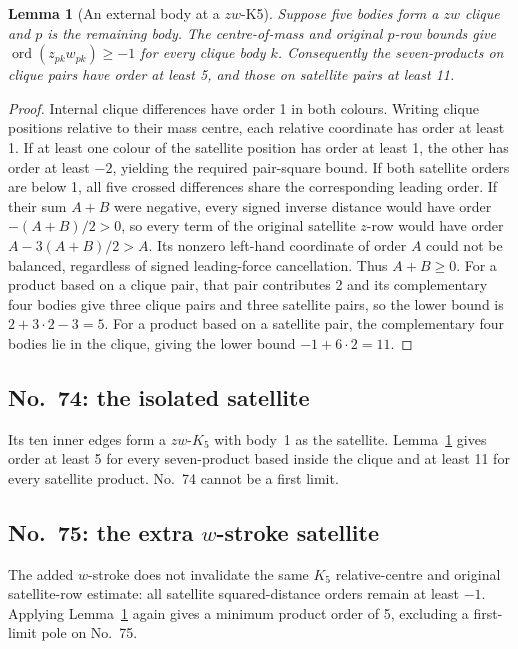 \documentclass[11pt]{amsart}
\newtheorem{lemma}[theorem]{Lemma}
\theoremstyle{remark}
\newcommand{\ord}{\operatorname{ord}}
\newcommand{\Needspace}[1]{\par\ifdim\dimexpr\pagegoal-\pagetotal\relax<#1\newpage\fi}
\begin{document}
\begin{lemma}[An external body at a $zw$-K5]\label{lem:excluded-satellite}
Suppose five bodies form a $zw$ clique and $p$ is the remaining body. The centre-of-mass and original $p$-row bounds give $\ord(z_{pk}w_{pk})\ge-1$ for every clique body $k$. Consequently the seven-products on clique pairs have order at least 5, and those on satellite pairs at least 11.
\end{lemma}
\begin{proof}
Internal clique differences have order 1 in both colours. Writing clique positions relative to their mass centre, each relative coordinate has order at least 1. If at least one colour of the satellite position has order at least 1, the other has order at least $-2$, yielding the required pair-square bound. If both satellite orders are below 1, all five crossed differences share the corresponding leading order. If their sum $A+B$ were negative, every signed inverse distance would have order $-(A+B)/2>0$, so every term of the original satellite $z$-row would have order $A-3(A+B)/2>A$. Its nonzero left-hand coordinate of order $A$ could not be balanced, regardless of signed leading-force cancellation. Thus $A+B\ge0$. For a product based on a clique pair, that pair contributes 2 and its complementary four bodies give three clique pairs and three satellite pairs, so the lower bound is $2+3\cdot2-3=5$. For a product based on a satellite pair, the complementary four bodies lie in the clique, giving the lower bound $-1+6\cdot2=11$.
\end{proof}
\Needspace{8\baselineskip}
\subsection{No.~74: the isolated satellite}
Its ten inner edges form a $zw$-$K_5$ with body~1 as the
satellite. Lemma~\ref{lem:excluded-satellite} gives order at
least 5 for every seven-product based inside the clique and at
least 11 for every satellite product. No.~74 cannot be a first
limit.

\Needspace{8\baselineskip}
\subsection{No.~75: the extra $w$-stroke satellite}
The added $w$-stroke does not invalidate the same $K_5$
relative-centre and original satellite-row estimate: all
satellite squared-distance orders remain at least $-1$.
Applying Lemma~\ref{lem:excluded-satellite} again gives a
minimum product order of 5, excluding a first-limit pole on
No.~75.
\end{document}
